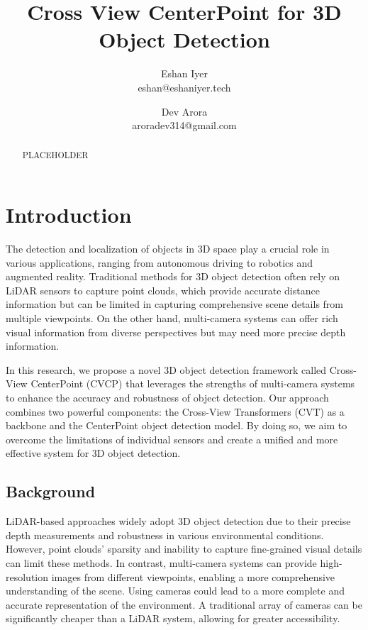 \documentclass[times, report, parskip, openbib, twocolumn]{article}
\title{\textbf{Cross View CenterPoint for 3D Object Detection}}
\author{Eshan Iyer \\ eshan@eshaniyer.tech  \and Dev Arora \\ aroradev314@gmail.com}
\date{}
\begin{document}
\maketitle

\begin{abstract}

    PLACEHOLDER
    
\end{abstract}

\section{Introduction}

The detection and localization of objects in 3D space play a crucial role in various applications, ranging from autonomous driving to robotics and augmented reality. Traditional methods for 3D object detection often rely on LiDAR sensors to capture point clouds, which provide accurate distance information but can be limited in capturing comprehensive scene details from multiple viewpoints. On the other hand, multi-camera systems can offer rich visual information from diverse perspectives but may need more precise depth information.

In this research, we propose a novel 3D object detection framework called Cross-View CenterPoint (CVCP) that leverages the strengths of multi-camera systems to enhance the accuracy and robustness of object detection. Our approach combines two powerful components: the Cross-View Transformers (CVT) as a backbone and the CenterPoint object detection model. By doing so, we aim to overcome the limitations of individual sensors and create a unified and more effective system for 3D object detection.

\subsection{Background}

LiDAR-based approaches widely adopt 3D object detection due to their precise depth measurements and robustness in various environmental conditions. However, point clouds' sparsity and inability to capture fine-grained visual details can limit these methods. In contrast, multi-camera systems can provide high-resolution images from different viewpoints, enabling a more comprehensive understanding of the scene. Using cameras could lead to a more complete and accurate representation of the environment. A traditional array of cameras can be significantly cheaper than a LiDAR system, allowing for greater accessibility.
\end{document}
